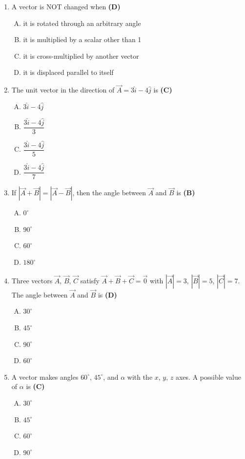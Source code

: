 \documentclass[10pt,a4paper]{article}
\begin{document}
\begin{enumerate}[1.]
\item A vector is NOT changed when \hfill \textbf{(D)}
\begin{enumerate}[(A)]
    \item it is rotated through an arbitrary angle
    \item it is multiplied by a scalar other than 1
    \item it is cross-multiplied by another vector
    \item it is displaced parallel to itself
\end{enumerate}

\item The unit vector in the direction of $\vec{A} = 3\hat{i} - 4\hat{j}$ is \hfill \textbf{(C)}
\begin{enumerate}[(A)]
    \item $3\hat{i} - 4\hat{j}$
    \item $\dfrac{3\hat{i} - 4\hat{j}}{3}$
    \item $\dfrac{3\hat{i} - 4\hat{j}}{5}$
    \item $\dfrac{3\hat{i} - 4\hat{j}}{7}$
\end{enumerate}

\item If $|\vec{A} + \vec{B}| = |\vec{A} - \vec{B}|$, then the angle between $\vec{A}$ and $\vec{B}$ is \hfill \textbf{(B)}
\begin{enumerate}[(A)]
    \item $0^\circ$
    \item $90^\circ$
    \item $60^\circ$
    \item $180^\circ$
\end{enumerate}

\item Three vectors $\vec{A}$, $\vec{B}$, $\vec{C}$ satisfy $\vec{A}+\vec{B}+\vec{C}=\vec{0}$ with $|\vec{A}|=3$, $|\vec{B}|=5$, $|\vec{C}|=7$. The angle between $\vec{A}$ and $\vec{B}$ is \hfill \textbf{(D)}
\begin{enumerate}[(A)]
    \item $30^\circ$
    \item $45^\circ$
    \item $90^\circ$
    \item $60^\circ$
\end{enumerate}

\item A vector makes angles $60^\circ$, $45^\circ$, and $\alpha$ with the $x$, $y$, $z$ axes. A possible value of $\alpha$ is \hfill \textbf{(C)}
\begin{enumerate}[(A)]
    \item $30^\circ$
    \item $45^\circ$
    \item $60^\circ$
    \item $90^\circ$
\end{enumerate}


\end{enumerate}
\end{document}
